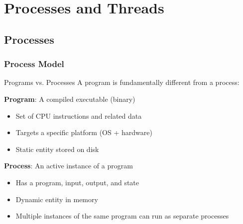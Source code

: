 \section{Processes and Threads}

\subsection{Processes}

\subsubsection{Process Model}

\begin{definition}{Programs vs. Processes}
    A program is fundamentally different from a process:
    \vspace{1mm}\\
    \begin{minipage}{0.5\linewidth}
    \textbf{Program}: A compiled executable (binary)
            \begin{itemize}
                \item Set of CPU instructions and related data
                \item Targets a specific platform (OS + hardware)
                \item Static entity stored on disk
            \end{itemize}
        \end{minipage}
    \begin{minipage}{0.5\linewidth}
        \textbf{Process}: An active instance of a program
            \begin{itemize}
                \item Has a program, input, output, and state
                \item Dynamic entity in memory
                \item Multiple instances of the same program can run as separate processes
            \end{itemize}
    \end{minipage}
\end{definition}



